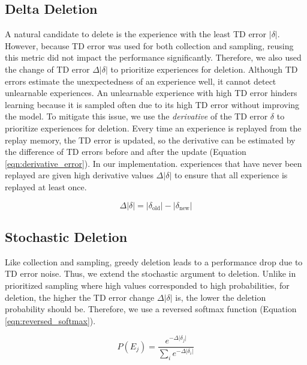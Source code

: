 \documentclass{article} %
\begin{document}
\subsection{Delta Deletion}
A natural candidate to delete is the experience with the least TD error $\lvert \delta \rvert$. However, because TD error was used for both collection and sampling, reusing this metric did not impact the performance significantly. Therefore, we also used the change of TD error $\Delta \lvert \delta \rvert$ to prioritize experiences for deletion. Although TD errors estimate the unexpectedness of an experience well, it cannot detect unlearnable experiences. An unlearnable experience with high TD error hinders learning because it is sampled often due to its high TD error without improving the model. To mitigate this issue, we use the \textit{derivative} of the TD error $\delta$ to prioritize experiences for deletion. Every time an experience is replayed from the replay memory, the TD error is updated, so the derivative can be estimated by the difference of TD errors before and after the update (Equation \ref{eqn:derivative_error}). In our implementation. experiences that have never been replayed are given high derivative values $\Delta \lvert \delta \rvert$ to ensure that all experience is replayed at least once.

\begin{equation}
\Delta \lvert \delta \rvert = \lvert \delta_{\text{old}} \rvert - \lvert \delta_{\text{new}} \rvert
\label{eqn:derivative_error}
\end{equation}

\subsection{Stochastic Deletion}
Like collection and sampling, greedy deletion leads to a performance drop due to TD error noise. Thus, we extend the stochastic argument to deletion. Unlike in prioritized sampling where high values corresponded to high probabilities, for deletion, the higher the TD error change $\Delta \lvert \delta \rvert$ is, the lower the deletion probability should be. Therefore, we use a reversed softmax function (Equation \ref{eqn:reversed_softmax}).

\begin{equation}
P(E_j) = \frac{e^{-\Delta \lvert \delta_j \rvert}}{\sum_i e^{-\Delta \lvert \delta_i \rvert}}
\label{eqn:reversed_softmax}
\end{equation}
\end{document}
